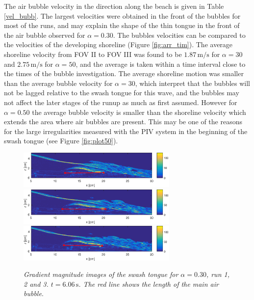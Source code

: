 \documentclass[review, authoryear]{elsarticle}
\newcommand{\s}{\,\mbox{s}}
\newcommand{\mps}{\,\mbox{m/s}}
\begin{document}
The air bubble velocity in the direction along the beach is given in Table \ref{vel_bubb}. The largest velocities were obtained in the front of the bubbles for most of the runs, and may explain the shape of the thin tongue in the front of the air bubble observed for $\alpha=0.30$. The bubbles velocities can be compared to the velocities of the developing shoreline (Figure \ref{fig:arr_tim}). The average shoreline velocity from  FOV II to FOV III was found to be $1.87\mps$ for $\alpha=30$ and $2.75\mps$ for $\alpha=50$, and the average is taken within a time interval close to the times of the bubble investigation. The average shoreline motion was smaller than the average bubble velocity for $\alpha=30$, which interpret that the bubbles will not be lagged relative to the swash tongue for this wave, and the bubbles may not affect the later stages of the runup as much as first assumed. However for $\alpha=0.50$ the average bubble velocity is smaller than the shoreline velocity which extends the area where air bubbles are present. This may be one of the reasons for the large irregularities measured with the PIV system in the beginning of the swash tongue (see Figure \ref{fig:plot50}).
\begin{figure}[]
\centering
\includegraphics[angle=5.1,width=0.7\textwidth]{./Figures/BUBBLE/bubble30_run1_r.eps}
\includegraphics[angle=5.1,width=0.7\textwidth]{./Figures/BUBBLE/bubble30_run2_r.eps}
\includegraphics[angle=5.1,width=0.7\textwidth]{./Figures/BUBBLE/bubble30_run3_r.eps}
\caption{\textit{Gradient magnitude images of the swash tongue for $\alpha=0.30$, run 1, 2 and 3. $t=6.06\s$. The red line shows the length of the main air bubble}.}
\label{fig:bubble_30}
\end{figure}
\end{document}
